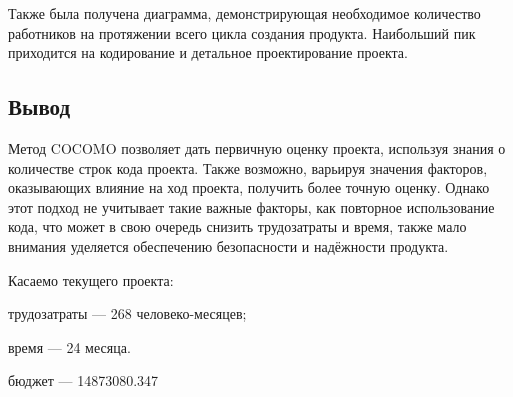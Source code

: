 Также была получена диаграмма, демонстрирующая необходимое количество работников на протяжении всего цикла создания продукта. Наибольший пик приходится на кодирование и детальное проектирование проекта.

\subsection*{Вывод}

Метод COCOMO позволяет дать первичную оценку проекта, используя знания о количестве строк кода проекта. Также возможно, варьируя значения факторов, оказывающих влияние на ход проекта, получить более точную оценку. Однако этот подход не учитывает такие важные факторы, как повторное использование кода, что может в свою очередь снизить трудозатраты и время, также мало внимания уделяется обеспечению безопасности и надёжности продукта.

Касаемо текущего проекта: 

трудозатраты --- 268 человеко-месяцев;

время --- 24 месяца.

бюджет --- 14873080.347
